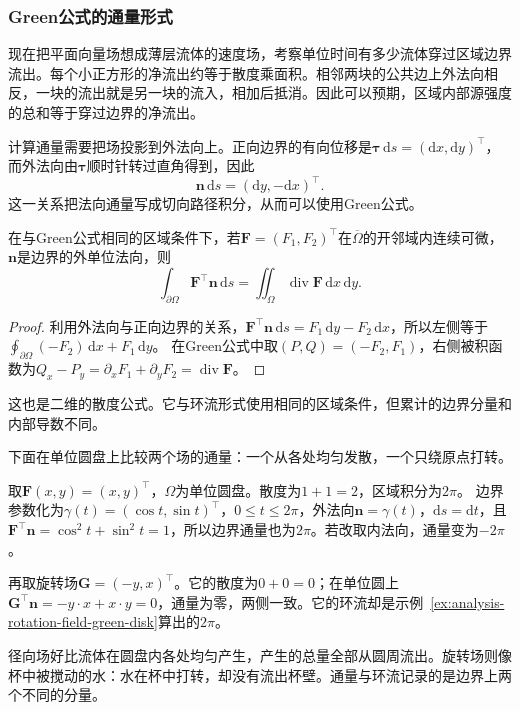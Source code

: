 \subsubsection{Green公式的通量形式}

现在把平面向量场想成薄层流体的速度场，考察单位时间有多少流体穿过区域边界流出。每个小正方形的净流出约等于散度乘面积。相邻两块的公共边上外法向相反，一块的流出就是另一块的流入，相加后抵消。因此可以预期，区域内部源强度的总和等于穿过边界的净流出。

计算通量需要把场投影到外法向上。正向边界的有向位移是$\bm\tau\,\mathrm ds=(\mathrm dx,\mathrm dy)^\top$，而外法向由$\bm\tau$顺时针转过直角得到，因此
\[
 \bm n\,\mathrm ds=(\mathrm dy,-\mathrm dx)^\top.
\]
这一关系把法向通量写成切向路径积分，从而可以使用Green公式。
\begin{theorem}[平面区域的通量公式]
\label{thm:multivariable-planar-flux}
在与Green公式相同的区域条件下，若$\bm F=(F_1,F_2)^\top$在$\overline\Omega$的开邻域内连续可微，
$\bm n$是边界的外单位法向，则
\[
 \int_{\partial\Omega}\bm F^\top\bm n\,\mathrm ds
 =\iint_\Omega\operatorname{div}\bm F\,\mathrm dx\,\mathrm dy.
\]
\end{theorem}
\begin{proof}
利用外法向与正向边界的关系，$\bm F^\top\bm n\,\mathrm ds=F_1\,\mathrm dy-F_2\,\mathrm dx$，所以左侧等于
$\oint_{\partial\Omega}(-F_2)\,\mathrm dx+F_1\,\mathrm dy$。
在Green公式中取$(P,Q)=(-F_2,F_1)$，右侧被积函数为$Q_x-P_y=\partial_xF_1+\partial_yF_2=\operatorname{div}\bm F$。
\end{proof}
这也是二维的散度公式。它与环流形式使用相同的区域条件，但累计的边界分量和内部导数不同。

下面在单位圆盘上比较两个场的通量：一个从各处均匀发散，一个只绕原点打转。
\begin{example}[单位圆盘上径向场与旋转场的通量]
取$\bm F(x,y)=(x,y)^\top$，$\Omega$为单位圆盘。散度为$1+1=2$，区域积分为$2\pi$。
边界参数化为$\gamma(t)=(\cos t,\sin t)^\top$，$0\leq t\leq2\pi$，外法向$\bm n=\gamma(t)$，$\mathrm ds=\mathrm dt$，且$\bm F^\top\bm n=\cos^2t+\sin^2t=1$，所以边界通量也为$2\pi$。若改取内法向，通量变为$-2\pi$。

再取旋转场$\bm G=(-y,x)^\top$。它的散度为$0+0=0$；在单位圆上$\bm G^\top\bm n=-y\cdot x+x\cdot y=0$，通量为零，两侧一致。它的环流却是示例~\ref{ex:analysis-rotation-field-green-disk}算出的$2\pi$。
\end{example}
径向场好比流体在圆盘内各处均匀产生，产生的总量全部从圆周流出。旋转场则像杯中被搅动的水：水在杯中打转，却没有流出杯壁。通量与环流记录的是边界上两个不同的分量。

